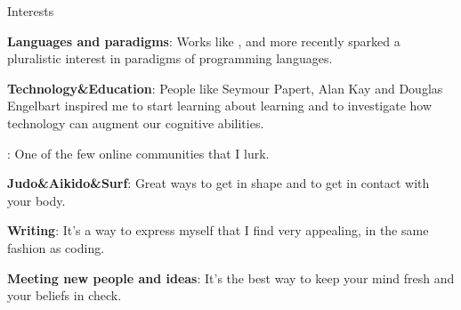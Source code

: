 \begin{rubric}{Interests}{

    \entry* \textbf{Languages and paradigms}: Works like
    ,
     and more recently
     sparked a pluralistic interest
    in paradigms of programming languages.


    \entry* \textbf{Technology\&Education}: People like 
    Seymour Papert, Alan Kay and Douglas Engelbart inspired me to
    start learning about learning and to investigate how technology can augment
    our cognitive abilities.

    \entry* \textbf{}: One of the few online
    communities that I lurk.

    \entry* \textbf{Judo\&Aikido\&Surf}: Great ways to get in shape and to get in
    contact with your body.

    \entry* \textbf{Writing}: It's a way to express myself that I find very
    appealing, in the same fashion as coding.

    \entry* \textbf{Meeting new people and ideas}: It's the best way to keep
    your mind fresh and your beliefs in check. 

}\end{rubric}

